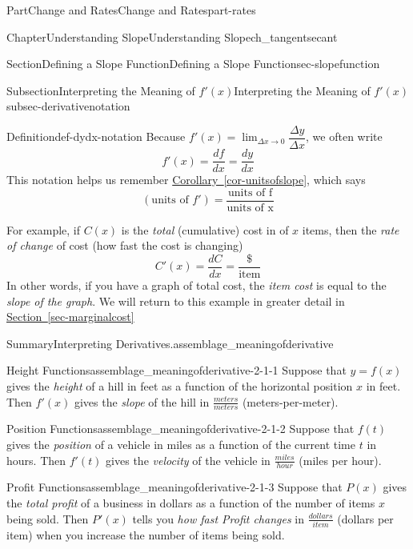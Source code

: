 \documentclass[oneside,10pt,]{tufte-book}
\newcommand{\xreffont}{\relax}
\numberwithin{equation}{chapter}
\begin{document}
\begin{partptx}{Part}{Change and Rates}{}{Change and Rates}{}{}{part-rates}
\begin{chapterptx}{Chapter}{Understanding Slope}{}{Understanding Slope}{}{}{ch_tangentsecant}
\begin{sectionptx}{Section}{Defining a Slope Function}{}{Defining a Slope Function}{}{}{sec-slopefunction}
\begin{subsectionptx}{Subsection}{Interpreting the Meaning of \(f'(x)\)}{}{Interpreting the Meaning of \(f'(x)\)}{}{}{subsec-derivativenotation}
\begin{definition}{Definition}{}{def-dydx-notation}
Because \(f'(x) = \lim_{\Delta x\rightarrow 0} \dfrac{\Delta y}{\Delta x}\), we often write%
\begin{equation*}
f'(x) = \dfrac{df}{dx} = \dfrac{dy}{dx}
\end{equation*}
This notation helps us remember \hyperref[cor-unitsofslope]{Corollary~{\xreffont\ref{cor-unitsofslope}}}, which says%
\begin{equation*}
(\text{units of }f') = \dfrac{\text{units of f}}{\text{units of x}}
\end{equation*}
%
\end{definition}
For example, if \(C(x)\) is the \emph{total} (cumulative) cost in \textdollar{} of \(x\) items, then the \emph{rate of change} of cost (how fast the cost is changing)%
\begin{equation*}
C'(x) = \dfrac{dC}{dx} = \dfrac{\$}{\text{item}}
\end{equation*}
In other words, if you have a graph of total cost, the \emph{item cost} is equal to the \emph{slope of the graph}. We will return to this example in greater detail in \hyperref[sec-marginalcost]{Section~{\xreffont\ref{sec-marginalcost}}}%
\begin{assemblage}{Summary}{Interpreting Derivatives.}{assemblage_meaningofderivative}%
%
\begin{descriptionlist}
\begin{dlimedium}{Height Functions}{assemblage_meaningofderivative-2-1-1}%
Suppose that \(y=f(x)\) gives the \emph{height} of a hill in feet as a function of the horizontal position \(x\) in feet. Then \(f'(x)\) gives the \emph{slope} of the hill in \(\frac{meters}{meters}\) (meters-per-meter).%
\end{dlimedium}%
\begin{dlimedium}{Position Functions}{assemblage_meaningofderivative-2-1-2}%
Suppose that \(f(t)\) gives the \emph{position} of a vehicle in miles as a function of the current time \(t\) in hours. Then \(f'(t)\) gives the \emph{velocity} of the vehicle in \(\frac{miles}{hour}\) (miles per hour).%
\end{dlimedium}%
\begin{dlimedium}{Profit Functions}{assemblage_meaningofderivative-2-1-3}%
Suppose that \(P(x)\) gives the \emph{total profit} of a business in dollars as a function of the number of items \(x\) being sold. Then \(P'(x)\) tells you  \emph{how fast Profit changes} in \(\frac{dollars}{item}\) (dollars per item) when you increase the number of items being sold.%
\end{dlimedium}%

\end{descriptionlist}
\end{assemblage}
\end{subsectionptx}
\end{sectionptx}
\end{chapterptx}
\end{partptx}
\end{document}
